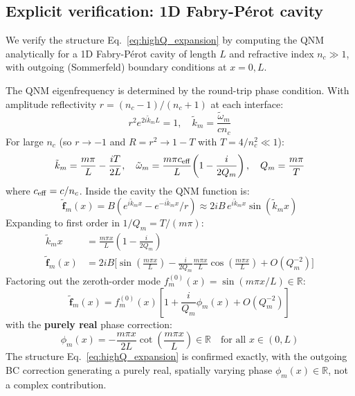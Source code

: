\documentclass[12pt]{article}
\newcommand{\tf}{\tilde{\mathbf{f}}}
\newcommand{\tomega}{\tilde{\omega}}
\begin{document}
\subsection*{Explicit verification: 1D Fabry-P\'{e}rot cavity}

We verify the structure Eq.~\eqref{eq:highQ_expansion} by computing the QNM
analytically for a 1D Fabry-P\'{e}rot cavity of length $L$ and refractive
index $n_c\gg 1$, with outgoing (Sommerfeld) boundary conditions at $x=0,L$.

The QNM eigenfrequency is determined by the round-trip phase condition.
With amplitude reflectivity $r=(n_c-1)/(n_c+1)$ at each interface:
\begin{equation}
  r^2 e^{2i\tilde{k}_m L} = 1,\quad \tilde{k}_m = \frac{\tomega_m}{cn_c}
  \label{eq:FP_dispersion}
\end{equation}
For large $n_c$ (so $r\to -1$ and $R=r^2\to 1-T$ with $T=4/n_c^2\ll 1$):
\begin{equation}
  \tilde{k}_m = \frac{m\pi}{L} - \frac{iT}{2L},\quad
  \tomega_m = \frac{m\pi c_{\rm eff}}{L}\!\left(1-\frac{i}{2Q_m}\right),\quad
  Q_m = \frac{m\pi}{T}
  \label{eq:FP_QNM_freq}
\end{equation}
where $c_{\rm eff}=c/n_c$.  Inside the cavity the QNM function is:
\begin{equation}
  \tf_m(x) = B\!\left(e^{i\tilde{k}_m x} - e^{-i\tilde{k}_m x}/r\right)
  \approx 2iB\,e^{i\tilde{k}_m x}\sin(\tilde{k}_m x)
\end{equation}
Expanding to first order in $1/Q_m = T/(m\pi)$:
\begin{align}
  \tilde{k}_m x &= \frac{m\pi x}{L}\!\left(1-\frac{i}{2Q_m}\right)\\
  \tf_m(x) &= 2iB\biggl[\sin\!\left(\frac{m\pi x}{L}\right)
  -\frac{i}{2Q_m}\frac{m\pi x}{L}\cos\!\left(\frac{m\pi x}{L}\right)
  +O(Q_m^{-2})\biggr]
\end{align}
Factoring out the zeroth-order mode $f_m^{(0)}(x)=\sin(m\pi x/L)\in\mathbb{R}$:
\begin{equation}
  \boxed{\tf_m(x) = f_m^{(0)}(x)\!\left[1+\frac{i}{Q_m}\phi_m(x)+O(Q_m^{-2})\right]}
  \label{eq:FP_highQ}
\end{equation}
with the \textbf{purely real} phase correction:
\begin{equation}
  \phi_m(x) = -\frac{m\pi x}{2L}\cot\!\left(\frac{m\pi x}{L}\right)
  \in\mathbb{R}\quad\text{for all }x\in(0,L)
  \label{eq:FP_phase}
\end{equation}
The structure Eq.~\eqref{eq:highQ_expansion} is confirmed exactly, with
the outgoing BC correction generating a purely real, spatially varying
phase $\phi_m(x)\in\mathbb{R}$, not a complex contribution.
\end{document}
